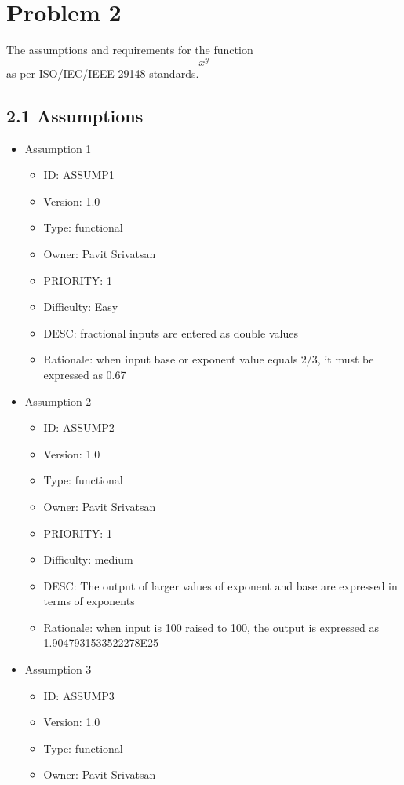 \documentclass{article}
\begin{document}
\section*{Problem 2}
The assumptions and requirements for the function \[x^y\] as per ISO/IEC/IEEE 29148 standards.

\subsection*{2.1 Assumptions}

\begin{itemize}
\item Assumption 1
\begin{itemize}
\item ID:       ASSUMP1
\item Version:  1.0
\item Type:     functional
\item Owner:    Pavit Srivatsan
\item PRIORITY: 1 
\item Difficulty: Easy
\item DESC: fractional inputs are entered as double values
\item Rationale: when input base or exponent value equals $2/3$, it must be expressed as 0.67
\end{itemize}
\item Assumption 2
\begin{itemize}
\item ID:       ASSUMP2
\item Version:  1.0
\item Type:     functional
\item Owner:    Pavit Srivatsan
\item PRIORITY: 1 
\item Difficulty: medium
\item DESC: The output of larger values of exponent and base are expressed in terms of exponents 
\item Rationale: when input is 100 raised to 100, the output is expressed as 1.9047931533522278E25
\end{itemize}
\item Assumption 3
\begin{itemize}
\item ID:       ASSUMP3
\item Version:  1.0
\item Type:     functional
\item Owner:    Pavit Srivatsan

\end{itemize}
\end{itemize}
\end{document}
